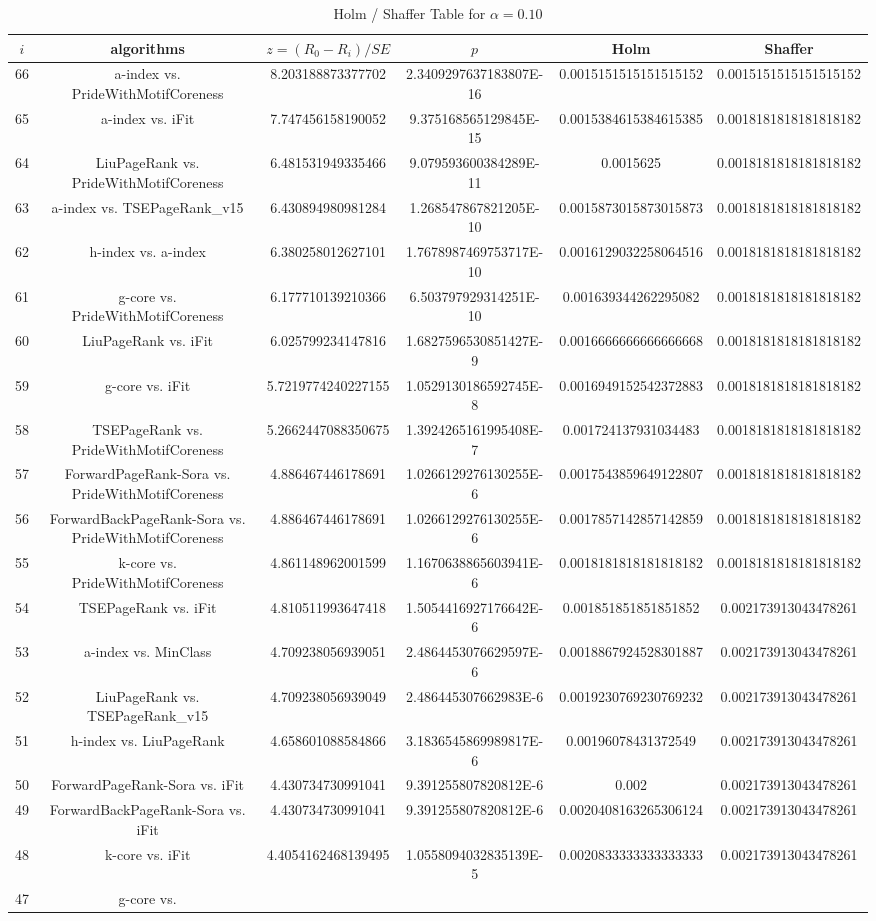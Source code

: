 \documentclass[a4paper,10pt]{article}
\begin{document}
\begin{landscape}
\begin{table}[!htp]
\centering\tiny
\caption{Holm / Shaffer Table for $\alpha=0.10$}
\begin{tabular}{cccccc}
$i$&algorithms&$z=(R_0 - R_i)/SE$&$p$&Holm&Shaffer\\
\hline
66&a-index vs. PrideWithMotifCoreness&8.203188873377702&2.3409297637183807E-16&0.0015151515151515152&0.0015151515151515152\\65&a-index vs. iFit&7.747456158190052&9.375168565129845E-15&0.0015384615384615385&0.0018181818181818182\\64&LiuPageRank vs. PrideWithMotifCoreness&6.481531949335466&9.079593600384289E-11&0.0015625&0.0018181818181818182\\63&a-index vs. TSEPageRank_v15&6.430894980981284&1.268547867821205E-10&0.0015873015873015873&0.0018181818181818182\\62&h-index vs. a-index&6.380258012627101&1.7678987469753717E-10&0.0016129032258064516&0.0018181818181818182\\61&g-core vs. PrideWithMotifCoreness&6.177710139210366&6.503797929314251E-10&0.001639344262295082&0.0018181818181818182\\60&LiuPageRank vs. iFit&6.025799234147816&1.6827596530851427E-9&0.0016666666666666668&0.0018181818181818182\\59&g-core vs. iFit&5.7219774240227155&1.0529130186592745E-8&0.0016949152542372883&0.0018181818181818182\\58&TSEPageRank vs. PrideWithMotifCoreness&5.2662447088350675&1.3924265161995408E-7&0.001724137931034483&0.0018181818181818182\\57&ForwardPageRank-Sora vs. PrideWithMotifCoreness&4.886467446178691&1.0266129276130255E-6&0.0017543859649122807&0.0018181818181818182\\56&ForwardBackPageRank-Sora vs. PrideWithMotifCoreness&4.886467446178691&1.0266129276130255E-6&0.0017857142857142859&0.0018181818181818182\\55&k-core vs. PrideWithMotifCoreness&4.861148962001599&1.1670638865603941E-6&0.0018181818181818182&0.0018181818181818182\\54&TSEPageRank vs. iFit&4.810511993647418&1.5054416927176642E-6&0.001851851851851852&0.002173913043478261\\53&a-index vs. MinClass&4.709238056939051&2.4864453076629597E-6&0.0018867924528301887&0.002173913043478261\\52&LiuPageRank vs. TSEPageRank_v15&4.709238056939049&2.486445307662983E-6&0.0019230769230769232&0.002173913043478261\\51&h-index vs. LiuPageRank&4.658601088584866&3.1836545869989817E-6&0.00196078431372549&0.002173913043478261\\50&ForwardPageRank-Sora vs. iFit&4.430734730991041&9.391255807820812E-6&0.002&0.002173913043478261\\49&ForwardBackPageRank-Sora vs. iFit&4.430734730991041&9.391255807820812E-6&0.0020408163265306124&0.002173913043478261\\48&k-core vs. iFit&4.4054162468139495&1.0558094032835139E-5&0.0020833333333333333&0.002173913043478261\\47&g-core vs. 
\end{tabular}
\end{table}
\end{landscape}
\end{document}
